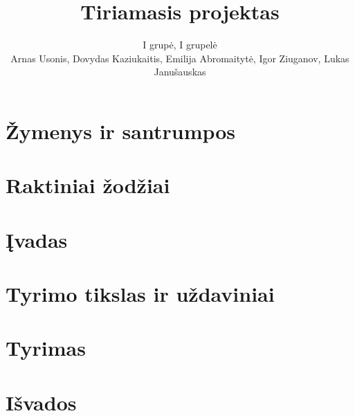 \documentclass{article}
\title{\textbf{Tiriamasis projektas}}
\author{I grupė, I grupelė \\
        \small Arnas Usonis, Dovydas Kaziukaitis, Emilija Abromaitytė, Igor Ziuganov, Lukas Janušauskas}
\date{ }
\begin{document}
\maketitle
\normalsize

\section{Žymenys ir santrumpos}


\section{Raktiniai žodžiai}


\section{Įvadas}


\section{Tyrimo tikslas ir uždaviniai}


\section{Tyrimas}


\section{Išvados}

\end{document}
